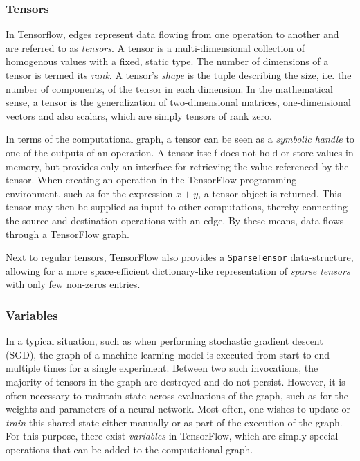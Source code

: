 \subsubsection{Tensors}\label{sec:model-graphs-tensors}

In Tensorflow, edges represent data flowing from one operation to another and
are referred to as \emph{tensors}. A tensor is a multi-dimensional collection of
homogenous values with a fixed, static type. The number of dimensions of a
tensor is termed its \emph{rank}. A tensor's \emph{shape} is the tuple
describing the size, i.e. the number of components, of the tensor in each
dimension. In the mathematical sense, a tensor is the generalization of
two-dimensional matrices, one-dimensional vectors and also scalars, which are
simply tensors of rank zero.

In terms of the computational graph, a tensor can be seen as a \emph{symbolic
  handle} to one of the outputs of an operation. A tensor itself does not hold
or store values in memory, but provides only an interface for retrieving the
value referenced by the tensor. When creating an operation in the TensorFlow
programming environment, such as for the expression $x + y$, a tensor object is
returned. This tensor may then be supplied as input to other computations,
thereby connecting the source and destination operations with an edge. By these
means, data flows through a TensorFlow graph.

Next to regular tensors, TensorFlow also provides a \texttt{SparseTensor}
data-structure, allowing for a more space-efficient dictionary-like
representation of \emph{sparse tensors} with only few non-zeros entries.

\subsubsection{Variables}\label{sec:model-graphs-vars}

In a typical situation, such as when performing stochastic gradient descent
(SGD), the graph of a machine-learning model is executed from start to end
multiple times for a single experiment. Between two such invocations, the
majority of tensors in the graph are destroyed and do not persist. However, it
is often necessary to maintain state across evaluations of the graph, such as
for the weights and parameters of a neural-network. Most often, one wishes to
update or \emph{train} this shared state either manually or as part of the
execution of the graph. For this purpose, there exist \emph{variables} in
TensorFlow, which are simply special operations that can be added to the
computational graph.

